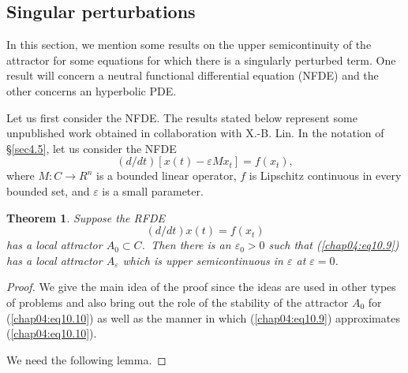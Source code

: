 \documentclass{surv-l}
\theoremstyle{plain}
\newtheorem{theorem}{Theorem}[section]
\theoremstyle{definition}
\numberwithin{equation}{section}
\numberwithin{figure}{chapter}
\begin{document}
\subsection{Singular perturbations}\label{subsec4.10.2} In this section, we mention some results on the upper semicontinuity of the attractor for some equations for which there is a singularly perturbed term. One result will concern a neutral functional differential equation (NFDE) and the other concerns an hyperbolic PDE.

Let us first consider the NFDE. The results stated below represent some unpublished work obtained in collaboration with X.-B. Lin. In the notation of \S \ref{sec4.5}, let us consider the NFDE
\begin{equation}\label{chap04:eq10.9}
(d/dt)[x(t)-\varepsilon Mx_{t}]=f(x_{t}),
\end{equation}
where $M:C\rightarrow R^{n}$ is a bounded linear operator, $f$ is Lipschitz continuous in every bounded set, and $\varepsilon$ is a small parameter.

\begin{theorem}\label{thm4.10.4} Suppose the RFDE
\begin{equation}\label{chap04:eq10.10}
(d/dt)x(t)=f(x_{t})
\end{equation}
has a local attractor $A_{0}\subset C$.\, Then there is an $\varepsilon_{0}>0$ such that \emph{(\ref{chap04:eq10.9})} has a local attractor $A_{\varepsilon}$ which is upper semicontinuous in $\varepsilon$ at $\varepsilon=0$.
\end{theorem}

\begin{proof} We give the main idea of the proof since the ideas are used in other types of problems and also bring out the role of the stability of the attractor $A_{0}$ for (\ref{chap04:eq10.10}) as well as the manner in which (\ref{chap04:eq10.9}) approximates (\ref{chap04:eq10.10}).

We need the following lemma.\end{proof}
\end{document}
